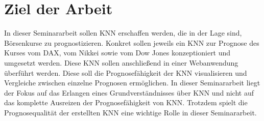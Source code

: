 \section{Ziel der Arbeit}
\label{section:Ziel der Arbeit}
In dieser Seminararbeit sollen KNN erschaffen werden, die in der Lage sind, Börsenkurse zu prognostizieren. Konkret sollen jeweils ein KNN zur Prognose des Kurses vom DAX, vom Nikkei sowie vom Dow Jones konzeptioniert und umgesetzt werden. Diese KNN sollen anschließend in einer Webanwendung überführt werden. Diese soll die Prognosefähigkeit der KNN visualisieren und Vergleiche zwischen einzelne Prognosen ermöglichen. In dieser Seminararbeit liegt der Fokus auf das Erlangen eines Grundverständnisses über KNN und nicht auf das komplette Ausreizen der Prognosefähigkeit von KNN. Trotzdem spielt die Prognosequalität der erstellten KNN eine wichtige Rolle in dieser Seminararbeit.





